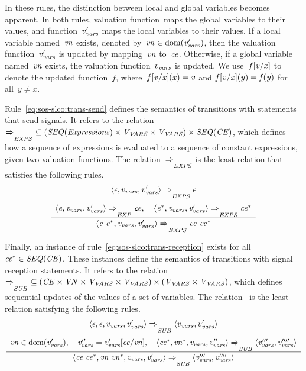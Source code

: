 \noindent
In these rules, the distinction between local and global variables becomes apparent.
In both rules, valuation function~\vvars maps the global variables to their values, and function~$v_{\it{vars}}'$ maps the local variables to their values.
If a local variable named~$\it{vn}$ exists, denoted by~$\it{vn} \in \operatorname{dom}(v_{\it{vars}}')$, then the valuation function~$v_{\it{vars}}'$ is updated by mapping~$\it{vn}$ to~$\it{ce}$.
Otherwise, if a global variable named~$\it{vn}$ exists, the valuation function~$v_{\it{vars}}$ is updated.
We use~$f[\it{v}/\it{x}]$ to denote the updated function~$f$, where~$f[\it{v}/\it{x}](x)=\it{v}$ and $f[\it{v}/\it{x}](y)=f(y)$ for all~$y \not = x$.

Rule~\eqref{eq:sos-slco:trans-send} defines the semantics of transitions with statements that send signals.
It refers to the relation~$\xRightarrow{\it{}}_{\it{EXPS}} ~ \subseteq (\it{SEQ}(\it Expressions) \times V_{\it{VARS}} \times V_{\it{VARS}}) \times \it{SEQ}(\it CE)$, which defines how a sequence of expressions is evaluated to a sequence of constant expressions, given two valuation functions.
The relation~$\xRightarrow{\it{}}_{\it{EXPS}}$ is the least relation that satisfies the following rules.
%
\begin{equation*}
\langle \epsilon, v_{\it{vars}}, v_{\it{vars}}' \rangle
\xRightarrow{\it{}}_{\it{EXPS}}
\epsilon
\end{equation*}
%
\begin{equation*}
 \frac{ \begin{array}[c]{c} 
\langle \it{e}, v_{\it{vars}}, v_{\it{vars}}' \rangle
\xRightarrow{\it{}}_{\it{EXP}}
\it{ce}, \quad
\langle \it{e^*}, v_{\it{vars}}, v_{\it{vars}}' \rangle
\xRightarrow{\it{}}_{\it{EXPS}}
\it{ce^*}
 \end{array} }{ \begin{array}[c]{c} 
\langle \it{e}~\it{e^*}, v_{\it{vars}}, v_{\it{vars}}' \rangle
\xRightarrow{\it{}}_{\it{EXPS}}
\it{ce}~\it{ce^*}
 \end{array} } 
\end{equation*}

Finally, an instance of rule~\eqref{eq:sos-slco:trans-reception} exists for all~$\it{ce^*} \in \it{SEQ}(\it CE)$.
These instances define the semantics of transitions with signal reception statements.
It refers to the relation~$\xRightarrow{\it{}}_{\it{SUB}} ~ \subseteq (\it CE \times \it VN \times V_{\it{VARS}} \times V_{\it{VARS}}) \times (V_{\it{VARS}} \times V_{\it{VARS}})$, which defines sequential updates of the values of a set of variables.
The relation~\MultipleSubstitutionRelation{} is the least relation satisfying the following rules.
%
\begin{equation*}
\langle \epsilon, \epsilon, v_{\it{vars}}, v_{\it{vars}}' \rangle
\xRightarrow{\it{}}_{\it{SUB}}
\langle v_{\it{vars}}, v_{\it{vars}}' \rangle
\end{equation*}
%
\begin{equation*}
 \frac{ \begin{array}[c]{c} 
\it{vn} \in \operatorname{dom}(v_{\it{vars}}'), \quad
v_{\it{vars}}'' = v_{\it{vars}}'[\it{ce}/\it{vn}], \quad
\langle \it{ce^*}, \it{vn^*}, v_{\it{vars}}, v_{\it{vars}}'' \rangle
\xRightarrow{\it{}}_{\it{SUB}}
\langle v_{\it{vars}}''', v_{\it{vars}}'''' \rangle
 \end{array} }{ \begin{array}[c]{c} 
\langle \it{ce}~\it{ce^*}, \it{vn}~\it{vn^*}, v_{\it{vars}}, v_{\it{vars}}' \rangle
\xRightarrow{\it{}}_{\it{SUB}}
\langle v_{\it{vars}}''', v_{\it{vars}}'''' \rangle
 \end{array} } 
\end{equation*}

